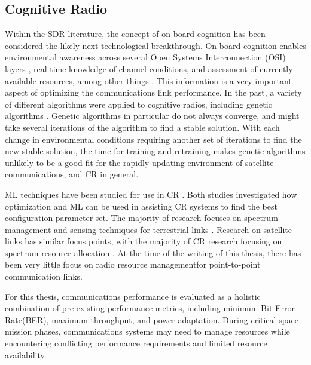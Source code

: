 \subsection{Cognitive Radio}
\par Within the SDR literature, the concept of on-board cognition has been considered the likely next technological breakthrough.  On-board cognition enables environmental awareness across several Open Systems Interconnection (OSI) layers \cite{paulo39}, real-time knowledge of channel conditions, and assessment of currently available resources, among other things . This information is a very important aspect of optimizing the communications link performance. In the past,  a variety of different algorithms were applied to cognitive radios\cite{paulo41}, including genetic algorithms \cite{paulo40}. Genetic algorithms in particular do not always converge, and might take several iterations of the algorithm to find a stable solution. With each change in environmental conditions requiring another set of iterations to find the new stable solution, the time for training and retraining makes genetic algorithms unlikely to be a good fit for the rapidly updating environment of satellite communications, and CR in general.
\par ML techniques have been studied for use in CR \cite{paulo42,paulo45}. Both studies investigated how optimization and ML can be used in assisting CR systems to find the best configuration parameter set. The majority of research focuses on spectrum management and sensing techniques for terrestrial links \cite{paulo45,paulo47}. Research on satellite links has similar focus points, with the majority of CR research focusing on spectrum resource allocation \cite{paulo48,paulo50}. At the time of the writing of this thesis, there has been very little focus on radio resource managementfor point-to-point communication links.
\par For this thesis, communications performance is evaluated as a holistic combination of pre-existing performance metrics, including minimum Bit Error Rate(BER), maximum throughput, and power adaptation. During critical space mission phases, communications systems may need to manage resources while encountering conflicting performance requirements and limited resource availability. 
